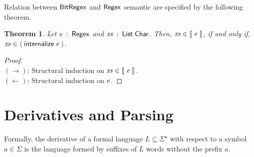 \documentclass[sigplan, anonymous, review]{acmart}
\newtheorem{Theorem}{Theorem}
\theoremstyle{definition}
\newcommand{\D}[1]{\blue{\mathsf{#1}}}
\newcommand{\F}[1]{\green{\mathsf{#1}}}
\newcommand{\V}[1]{\purple{\mathit{#1}}}
\begin{document}
Relation between \ensuremath{\D{BitRegex}} and \ensuremath{\D{Regex}} semantic are specified by
the following theorem.
\begin{Theorem}
Let \ensuremath{\V{e}\;\mathbin{:}\;\D{Regex}} and \ensuremath{\V{xs}\;\mathbin{:}\;\D{List}\;\D{Char}}. Then, \ensuremath{\V{xs}\;\D{\in\llbracket}\;\V{e}\;\D{\rrbracket}}, if and only if,
\ensuremath{\V{xs}\;\D{\in\langle}\;\F{internalize}\;\V{e}\;\D{\rangle}}.
\end{Theorem}
\begin{proof}$\,$\\
$(\to)$: Structural induction on \ensuremath{\V{xs}\;\D{\in\llbracket}\;\V{e}\;\D{\rrbracket}}.\\
$(\leftarrow)$: Structural induction on \ensuremath{\V{e}}.
\end{proof}

\section{Derivatives and Parsing}\label{sec:deriv}

Formally, the derivative of a formal language $L\subseteq
\Sigma^\star$ with respect to a symbol $a\in\Sigma$ is the language
formed by suffixes of $L$ words without the prefix $a$.
\end{document}
